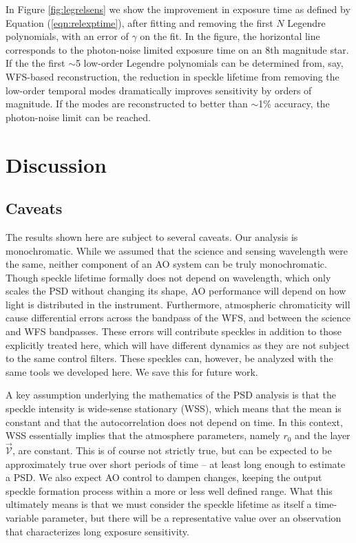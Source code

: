 \documentclass[10pt,preprint]{aastex631}
\begin{document}
In Figure \ref{fig:legrelsens} we show the improvement in exposure time as defined by Equation (\ref{eqn:relexptime}), after fitting and removing the first $N$ Legendre polynomials, with an error of $\gamma$ on the fit.  In the figure, the horizontal line corresponds to the photon-noise limited exposure time on an 8th magnitude star.  If the the first $\sim$5 low-order Legendre polynomials can be determined from, say, WFS-based reconstruction, the reduction in speckle lifetime from removing the low-order temporal modes dramatically improves sensitivity by orders of magnitude.  If the modes are reconstructed to better than $\sim$1\% accuracy, the photon-noise limit can be reached.

\section{Discussion}
\label{sec:discussion}

\subsection{Caveats}
The results shown here are subject to several caveats.  Our analysis is monochromatic. While we assumed that the science and sensing wavelength were the same, neither component of an AO system can be truly monochromatic.  Though speckle lifetime formally does not depend on wavelength, which only scales the PSD without changing its shape, AO performance will depend on how light is distributed in the instrument.  Furthermore, atmospheric chromaticity will cause differential errors across the bandpass of the WFS, and between the science and WFS bandpasses.  These errors will contribute speckles in addition to those explicitly treated here, which will have different dynamics as they are not subject to the same control filters.  These speckles can, however, be analyzed with the same tools we developed here.  We save this for future work.

A key assumption underlying the mathematics of the PSD analysis is that the speckle intensity is wide-sense stationary (WSS), which means that the mean is constant and that the autocorrelation does not depend on time.  In this context, WSS essentially implies that the atmosphere parameters, namely $r_0$ and the layer $\vec{\mathcal{V}}$, are constant.  This is of course not strictly true, but can be expected to be approximately true over short periods of time -- at least long enough to estimate a PSD.  We also expect AO control to dampen changes, keeping the output speckle formation process within a more or less well defined range.  What this ultimately means is that we must consider the speckle lifetime as itself a time-variable parameter, but there will be a representative value over an observation that characterizes long exposure sensitivity.
\end{document}
